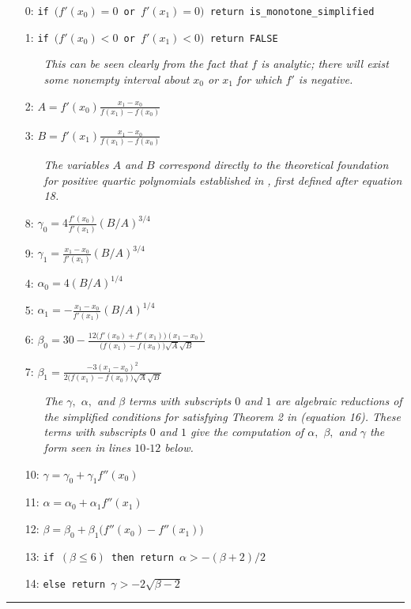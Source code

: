 \documentclass{scspaperproc}
\theoremstyle{scsthe}
\begin{document}
\begin{itemize}
  \itemsep0pt
  \parskip0pt

\item[0:] \texttt{if $\big(f'(x_0) = 0$ or $f'(x_1) = 0\big)$ return is\_monotone\_simplified}
\item[1:] \texttt{if $\big(f'(x_0) < 0$ or $f'(x_1) < 0\big)$ return FALSE}
  \begin{itemize}
    \item[] \textit{This can be seen clearly from the fact that $f$ is analytic; there will exist some nonempty interval about $x_0$ or $x_1$ for which $f'$ is negative.}
  \end{itemize}

\item[2:] $A = f'(x_0)\frac{x_1 - x_0}{f(x_1) - f(x_0)}$
\item[3:] $B = f'(x_1) \frac{x_1 - x_0}{f(x_1) - f(x_0)}$
  \begin{itemize}
    \item[] \textit{The variables $A$ and $B$ correspond directly to the theoretical foundation for positive quartic polynomials established in \cite{ulrich1994positivity}, first defined after equation 18.}
  \end{itemize}
\item[8:] $\gamma_0 = 4 \frac{f'(x_0)}{f'(x_1)} (B/A)^{3/4}$
\item[9:] $\gamma_1 = \frac{x_1 - x_0}{f'(x_1)} (B/A)^{3/4}$
\item[4:] $\alpha_0 = 4 (B/A)^{1/4}$
\item[5:] $\alpha_1 = -\frac{x_1 - x_0}{f'(x_1)} (B/A)^{1/4}$
\item[6:] $\beta_0 = 30 - \frac{12 \big(f'(x_0) + f'(x_1)\big) (x_1 - x_0)}{\big(f(x_1) - f(x_0)\big) \sqrt{A}\sqrt{B}}$
\item[7:] $\beta_1 = \frac{-3 (x_1 - x_0)^2}{2 \big(f(x_1) - f(x_0)\big) \sqrt{A} \sqrt{B}} $
  \begin{itemize}
    \item[] \textit{The $\gamma,$ $\alpha,$ and $\beta$ terms with subscripts $0$ and $1$ are algebraic reductions of the simplified conditions for satisfying Theorem 2 in \cite{ulrich1994positivity} (equation 16). These terms with subscripts $0$ and $1$ give the computation of $\alpha,$ $\beta,$ and $\gamma$ the form seen in lines $10$-$12$ below.}
  \end{itemize}
\item[10:] $\gamma = \gamma_0 + \gamma_1 f''(x_0)$
\item[11:] $\alpha = \alpha_0 + \alpha_1 f''(x_1)$
\item[12:] $\beta = \beta_0 + \beta_1 \big(f''(x_0) - f''(x_1)\big)$
\item[13:] \texttt{if $(\beta \leq 6)$ then return $\alpha > - (\beta + 2) / 2$}
\item[14:] \texttt{else return $\gamma > -2 \sqrt{\beta - 2}$ }

\end{itemize}
\hrule
\vspace{10pt}
\end{document}

